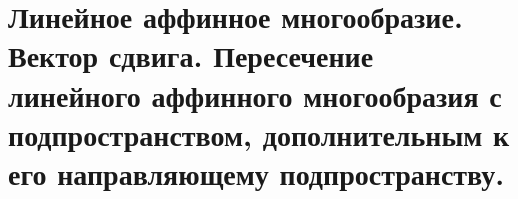\section{
    Линейное аффинное многообразие. Вектор сдвига. Пересечение линейного аффинного многообразия с подпространством, дополнительным к его направляющему подпространству.
}


